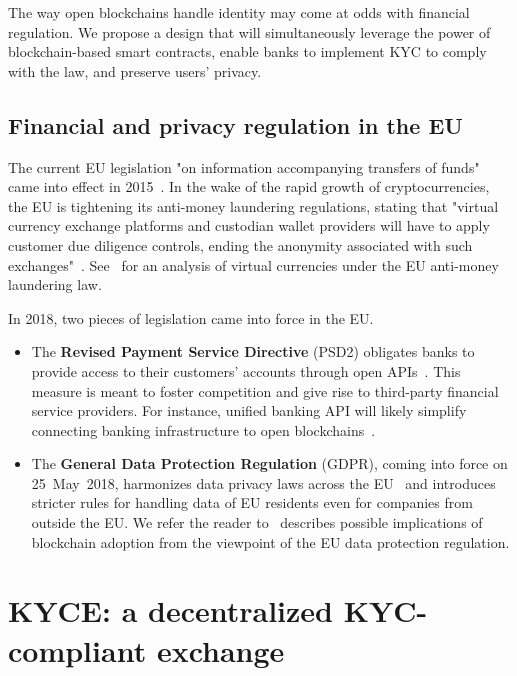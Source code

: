 The way open blockchains handle identity may come at odds with financial regulation.
We propose a design that will simultaneously leverage the power of blockchain-based smart contracts, enable banks to implement KYC to comply with the law, and preserve users' privacy.


\subsection{Financial and privacy regulation in the EU} \label{sec:Ch12KYCEU}

The current EU legislation "on information accompanying transfers of funds" came into effect in 2015~\cite{EU847}.
In the wake of the rapid growth of cryptocurrencies, the EU is tightening its anti-money laundering regulations, stating that "virtual currency exchange platforms and custodian wallet providers will have to apply customer due diligence controls, ending the anonymity associated with such exchanges"~\cite{EU16}.
See~\cite{Vandezande2017} for an analysis of virtual currencies under the EU anti-money laundering law.

In 2018, two pieces of legislation came into force in the EU.

\begin{itemize}
	\item The \textbf{Revised Payment Service Directive} (PSD2) obligates banks to provide access to their customers' accounts through open APIs~\cite{Hellstroem2017}.
	This measure is meant to foster competition and give rise to third-party financial service providers.
	For instance, unified banking API will likely simplify connecting banking infrastructure to open blockchains~\cite{Elison2016}.
	\item The \textbf{General Data Protection Regulation} (GDPR), coming into force on 25~May~2018, harmonizes data privacy laws across the EU~\cite{GDPR16} and introduces stricter rules for handling data of EU residents even for companies from outside the EU. We refer the reader to~\cite{Berberich2016} describes possible implications of blockchain adoption from the viewpoint of the EU data protection regulation.
\end{itemize}




\section{KYCE: a decentralized KYC-compliant exchange}

